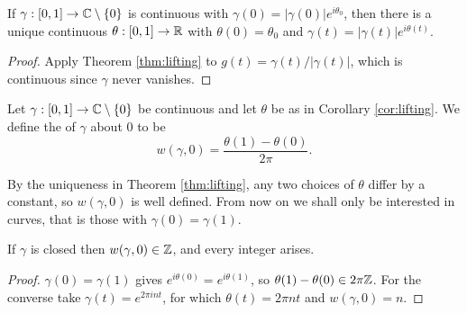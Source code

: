 \documentclass[a4paper]{scrartcl}
\begin{document}
\begin{corollary}\label{cor:lifting}
	If $\gamma : [0,1]\to\mathbb{C}\setminus\{0\}$ is continuous with $\gamma(0)=|\gamma(0)|e^{i\theta_0}$, then there is a unique continuous $\theta : [0,1]\to\mathbb{R}$ with $\theta(0)=\theta_0$ and $\gamma(t) = |\gamma(t)|e^{i\theta(t)}$.
\end{corollary}

\begin{proof}
	Apply Theorem \ref{thm:lifting} to $g(t) = \gamma(t)/|\gamma(t)|$, which is continuous since $\gamma$ never vanishes.
\end{proof}

\begin{definition}
	Let $\gamma:[0,1]\to\mathbb{C}\setminus\{0\}$ be continuous and let $\theta$ be as in Corollary \ref{cor:lifting}. We define the  of $\gamma$ about $0$ to be
	$$w(\gamma,0) = \frac{\theta(1)-\theta(0)}{2\pi}.$$
\end{definition}

By the uniqueness in Theorem \ref{thm:lifting}, any two choices of $\theta$ differ by a constant, so $w(\gamma,0)$ is well defined. From now on we shall only be interested in  curves, that is those with $\gamma(0)=\gamma(1)$.

\begin{lemma}
	If $\gamma$ is closed then $w(\gamma,0)\in\mathbb{Z}$, and every integer arises.
\end{lemma}

\begin{proof}
	$\gamma(0)=\gamma(1)$ gives $e^{i\theta(0)}=e^{i\theta(1)}$, so $\theta(1)-\theta(0)\in2\pi\mathbb{Z}$. For the converse take $\gamma(t) = e^{2\pi int}$, for which $\theta(t)=2\pi nt$ and $w(\gamma,0)=n$.
\end{proof}
\end{document}
